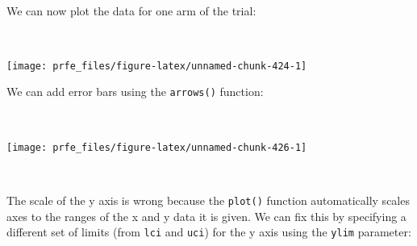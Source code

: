 \documentclass[12pt,a4paper]{book}
\newenvironment{Shaded}{\begin{snugshade}}{\end{snugshade}}
\newcommand{\DataTypeTok}[1]{\textcolor[rgb]{0.13,0.29,0.53}{#1}}
\newcommand{\DecValTok}[1]{\textcolor[rgb]{0.00,0.00,0.81}{#1}}
\newcommand{\FloatTok}[1]{\textcolor[rgb]{0.00,0.00,0.81}{#1}}
\newcommand{\KeywordTok}[1]{\textcolor[rgb]{0.13,0.29,0.53}{\textbf{#1}}}
\newcommand{\NormalTok}[1]{#1}
\newcommand{\OperatorTok}[1]{\textcolor[rgb]{0.81,0.36,0.00}{\textbf{#1}}}
\newcommand{\StringTok}[1]{\textcolor[rgb]{0.31,0.60,0.02}{#1}}
\theoremstyle{definition}
\theoremstyle{definition}
\theoremstyle{definition}
\theoremstyle{remark}
\begin{document}
~

We can now plot the data for one arm of the trial:

~

\begin{Shaded}
\end{Shaded}

\begin{center}\texttt{[image: prfe\_files/figure-latex/unnamed-chunk-424-1]} \end{center}

\newpage

We can add error bars using the \texttt{arrows()} function:

~

\begin{Shaded}
\end{Shaded}

\begin{center}\texttt{[image: prfe\_files/figure-latex/unnamed-chunk-426-1]} \end{center}

~

The scale of the y axis is wrong because the \texttt{plot()} function
automatically scales axes to the ranges of the x and y data it is given.
We can fix this by specifying a different set of limits (from
\texttt{lci} and \texttt{uci}) for the y axis using the \texttt{ylim}
parameter:

~

\begin{Shaded}
\end{Shaded}
\end{document}
